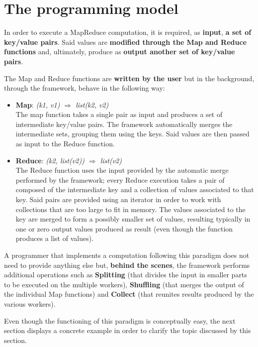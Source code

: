 \section{The programming model}
In order to execute a MapReduce computation, it is required, as \textbf{input}, \textbf{a set of key/value pairs}. Said values are \textbf{modified through the Map and Reduce functions} and, ultimately, produce as \textbf{output another set of key/value pairs}. 

The Map and Reduce functions are \textbf{written by the user} but in the background, through the framework, behave in the following way:
\begin{itemize}
    \item \textbf{Map}: \textit{(k1, v1) $\Longrightarrow$ list(k2, v2)}\\
    The map function takes a single pair as input and produces a set of intermediate key/value pairs. The framework automatically merges the intermediate sets, grouping them using the keys. Said values are then passed as input to the Reduce function.
    \item \textbf{Reduce}: \textit{(k2, list(v2)) $\Longrightarrow$ list(v2)}\\
    The Reduce function uses the input provided by the automatic merge performed by the framework; every Reduce execution takes a pair of composed of the intermediate key and a collection of values associated to that key. Said pairs are provided using an iterator in order to work with collections that are too large to fit in memory. The values associated to the key are merged to form a possibly smaller set of values, resulting typically in one or zero output values produced as result (even though the function produces a list of values).
\end{itemize}
A programmer that implements a computation following this paradigm does not need to provide anything else but, \textbf{behind the scenes}, the framework performs additional operations such as \textbf{Splitting} (that divides the input in smaller parts to be executed on the multiple workers), \textbf{Shuffling} (that merges the output of the individual Map functions) and \textbf{Collect} (that reunites results produced by the various workers).

Even though the functioning of this paradigm is conceptually easy, the next section displays a concrete example in order to clarify the topic discussed by this section.